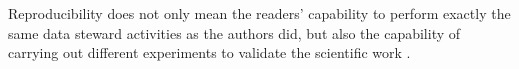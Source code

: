Reproducibility does not only mean the readers' capability to perform exactly the same data steward activities as the authors did, but also the capability of carrying out different experiments to validate the scientific work \cite{drummond2009replicability}. 
\cite{goble2014better}



